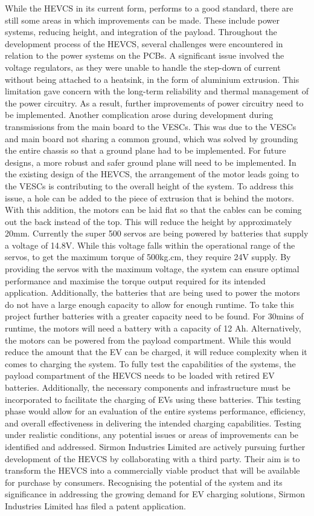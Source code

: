 \documentclass [12pt]{article}
\begin{document}
While the HEVCS in its current form, performs to a good standard, there are still some areas in which improvements can be made. These include power systems, reducing height, and integration of the payload.
Throughout the development process of the HEVCS, several challenges were encountered in relation to the power systems on the PCBs. A significant issue involved the voltage regulators, as they were unable to handle the step-down of current without being attached to a heatsink, in the form of aluminium extrusion. This limitation gave concern with the long-term reliability and thermal management of the power circuitry. As a result, further improvements of power circuitry need to be implemented.
Another complication arose during development during transmissions from the main board to the VESCs. This was due to the VESCs and main board not sharing a common ground, which was solved by grounding the entire chassis so that a ground plane had to be implemented. For future designs, a more robust and safer ground plane will need to be implemented.
In the existing design of the HEVCS, the arrangement of the motor leads going to the VESCs is contributing to the overall height of the system. To address this issue, a hole can be added to the piece of extrusion that is behind the motors. With this addition, the motors can be laid flat so that the cables can be coming out the back instead of the top. This will reduce the height by approximately 20mm.
Currently the super 500 servos are being powered by batteries that supply a voltage of 14.8V. While this voltage falls within the operational range of the servos, to get the maximum torque of 500kg.cm, they require 24V supply. By providing the servos with the maximum voltage, the system can ensure optimal performance and maximise the torque output required for its intended application.
Additionally, the batteries that are being used to power the motors do not have a large enough capacity to allow for enough runtime. To take this project further batteries with a greater capacity need to be found. For 30mins of runtime, the motors will need a battery with a capacity of 12 Ah. Alternatively, the motors can be powered from the payload compartment. While this would reduce the amount that the EV can be charged, it will reduce complexity when it comes to charging the system.
To fully test the capabilities of the systems, the payload compartment of the HEVCS needs to be loaded with retired EV batteries. Additionally, the necessary components and infrastructure must be incorporated to facilitate the charging of EVs using these batteries. This testing phase would allow for an evaluation of the entire systems performance, efficiency, and overall effectiveness in delivering the intended charging capabilities. Testing under realistic conditions, any potential issues or areas of improvements can be identified and addressed.
Sirmon Industries Limited are actively pursuing further development of the HEVCS by collaborating with a third party. Their aim is to transform the HEVCS into a commercially viable product that will be available for purchase by consumers. Recognising the potential of the system and its significance in addressing the growing demand for EV charging solutions, Sirmon Industries Limited has filed a patent application.
\end{document}
